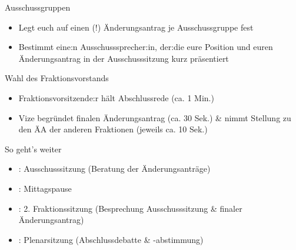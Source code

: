 \documentclass{beamer}
\begin{document}
\begin{frame}{Ausschussgruppen}
\vspace{-1.5cm}
\begin{itemize}
    \item Legt euch auf einen (!) Änderungsantrag je Ausschussgruppe fest
    \item Bestimmt eine:n Ausschusssprecher:in, der:die eure Position und euren Änderungsantrag in der Ausschusssitzung kurz präsentiert
\end{itemize}
\end{frame}



\begin{frame}{Wahl des Fraktionsvorstands}
\vspace{-1.5cm}
\begin{itemize}
    \item Fraktionsvorsitzende:r hält Abschlussrede (ca. 1 Min.)
    \item Vize begründet finalen Änderungsantrag (ca. 30 Sek.) \& nimmt Stellung zu den ÄA der anderen Fraktionen \newline (jeweils ca. 10 Sek.)
\end{itemize} 
\end{frame}



\begin{frame}{So geht's weiter}
\vspace{-1.5cm}
\begin{itemize}
    \item \timeAuss: Ausschusssitzung \newline (Beratung der Änderungsanträge)
    \item \timeMittag: Mittagspause
    \item \timeFrakTwo: 2. Fraktionssitzung (Besprechung Ausschusssitzung \& finaler Änderungsantrag)
    \item \timePlenar: Plenarsitzung \newline (Abschlussdebatte \& -abstimmung)
\end{itemize}
\end{frame}
\end{document}
